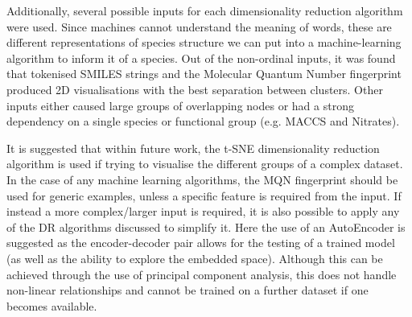 Additionally, several possible inputs for each dimensionality reduction algorithm were used. Since machines cannot understand the meaning of words, these are different representations of species structure we can put into a machine-learning algorithm to inform it of a species. Out of the non-ordinal inputs, it was found that tokenised SMILES strings and the Molecular Quantum Number fingerprint produced 2D visualisations with the best separation between clusters. Other inputs either caused large groups of overlapping nodes or had a strong dependency on a single species or functional group (e.g. MACCS and Nitrates).

It is suggested that within future work, the t-SNE dimensionality reduction algorithm is used if trying to visualise the different groups of a complex dataset. In the case of any machine learning algorithms, the MQN fingerprint should be used for generic examples, unless a specific feature is required from the input. If instead a more complex/larger input is required, it is also possible to apply any of the DR algorithms discussed to simplify it. Here the use of an AutoEncoder is suggested as the encoder-decoder pair allows for the testing of a trained model (as well as the ability to explore the embedded space). Although this can be achieved through the use of principal component analysis, this does not handle non-linear relationships and cannot be trained on a further dataset if one becomes available.
